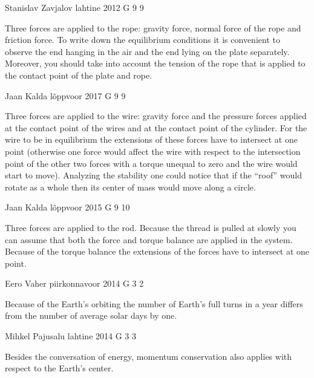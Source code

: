 \documentclass[11pt]{article}
\begin{document}
{Stanislav Zavjalov} %
{lahtine} %
{2012} %
{G 9} %
{9} %
{

\ifEngHint
Three forces are applied to the rope: gravity force, normal force of the rope and friction force. To write down the equilibrium conditions it is convenient to observe the end hanging in the air and the end lying on the plate separately.  Moreover, you should take into account the tension of the rope that is applied to the contact point of the plate and rope.
\fi
}

{Jaan Kalda} %
{lõppvoor} %
{2017} %
{G 9} %
{9} %
{

\ifEngHint
Three forces are applied to the wire: gravity force and the pressure forces applied at the contact point of the wires and at the contact point of the cylinder. For the wire to be in equilibrium the extensions of these forces have to intersect at one point (otherwise one force would affect the wire with respect to the intersection point of the other two forces with a torque unequal to zero and the wire would start to move). Analyzing the stability one could notice that if the “roof” would rotate as a whole then its center of mass would move along a circle.
\fi
}

{Jaan Kalda} %
{lõppvoor} %
{2015} %
{G 9} %
{10} %
{

\ifEngHint
Three forces are applied to the rod. Because the thread is pulled at slowly you can assume that both the force and torque balance are applied in the system. Because of the torque balance the extensions of the forces have to intersect at one point.
\fi
}

{Eero Vaher} %
{piirkonnavoor} %
{2014} %
{G 3} %
{2} %
{

\ifEngHint
Because of the Earth’s orbiting the number of Earth’s full turns in a year differs from the number of average solar days by one.
\fi
}

{Mihkel Pajusalu} %
{lahtine} %
{2014} %
{G 3} %
{3} %
{

\ifEngHint
Besides the conversation of energy, momentum conservation also applies with respect to the Earth’s center.
\fi
}
\end{document}
